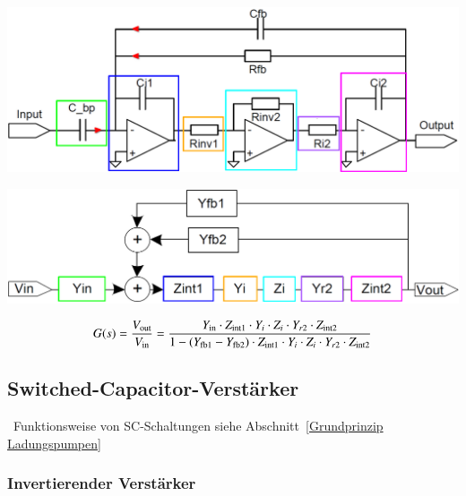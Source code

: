 \begin{minipage}[c]{0.48\columnwidth}
    \includegraphics[width=\columnwidth]{images/signalflussdiagramme_bandpass_schaltung.png}
\end{minipage}
\hfill
\begin{minipage}[c]{0.48\columnwidth}
    \includegraphics[width=\columnwidth]{images/signalflussdiagramme_bandpass_blockschaltbild.png}
\end{minipage}

$$ G(s) = \frac{V_{\rm out}}{V_{\rm in}} = \frac{Y_{\rm in} \cdot Z_{\rm int1} \cdot Y_i \cdot Z_i \cdot Y_{r2} \cdot Z_{\rm int2} }
    {1 - (Y_{\rm fb1} - Y_{\rm fb2}) \cdot Z_{\rm int1} \cdot Y_i \cdot Z_i \cdot Y_{r2} \cdot Z_{\rm int2} } $$




\subsection{Switched-Capacitor-Verstärker}

\textrightarrow\ Funktionsweise von SC-Schaltungen siehe Abschnitt~\ref{Grundprinzip Ladungspumpen}


\subsubsection{Invertierender Verstärker}

